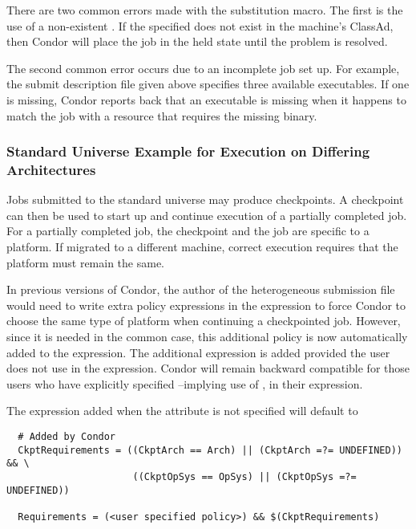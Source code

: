 There are two common errors made with the substitution macro.
The first is the use of a non-existent .
If the specified  does not
exist in the machine's ClassAd, then Condor will place
the job in the held state until the problem is resolved.

The second common error occurs due to an incomplete job set up.
For example, the submit description file given above specifies
three available executables.
If one is missing, Condor reports back that an
executable is missing when it happens to match the
job with a resource that requires the missing binary.

\subsubsection{Standard Universe Example for Execution on Differing Architectures} 

Jobs submitted to the standard universe may produce checkpoints.
A checkpoint can then be used to start up and continue execution
of a partially completed job.
For a partially completed job, the checkpoint and the job are specific
to a platform.
If migrated to a different machine, correct execution requires that
the platform must remain the same.

In previous versions of Condor, the author of the heterogeneous
submission file would need to write extra policy expressions in the
 expression to force Condor to choose the
same type of platform when continuing a checkpointed job.
However, since it is needed in the common case, this
additional policy is now automatically added
to the  expression.
The additional expression is added
provided the user does not use
 in the  expression.
Condor will remain backward compatible for those users who have explicitly
specified --implying use of ,
in their  expression.

The expression added when the attribute  is not specified 
will default to

\footnotesize
\begin{verbatim}
  # Added by Condor
  CkptRequirements = ((CkptArch == Arch) || (CkptArch =?= UNDEFINED)) && \
                      ((CkptOpSys == OpSys) || (CkptOpSys =?= UNDEFINED))

  Requirements = (<user specified policy>) && $(CkptRequirements)
\end{verbatim}
\normalsize

